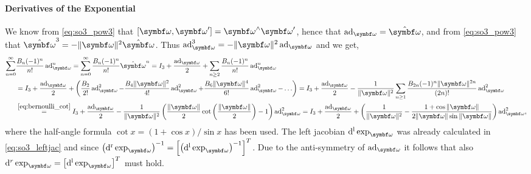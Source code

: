 \paragraph{Derivatives of the Exponential}

We know from \eqref{eq:so3_pow3} that $[\bomega, \bomega'] = \bomega^\wedge \bomega'$, hence that $\ad_\bomega = \hat \bomega$, and from \eqref{eq:so3_pow3} that $\hat \bomega^3 = - \| \bomega \|^2 \hat \bomega$. Thus $\ad_\bomega^3 = -\| \bomega \|^2 \ad_\bomega$ and we get,
\begin{equation*}
  \begin{aligned}
    \sum_{n=0}^\infty
     &
    \frac{B_n (-1)^n}{n!} \ad_\bomega^n
    = \sum_{n=0}^\infty \frac{B_n (-1)^n}{n!} \hat \bomega^n = I_3 + \frac{\ad_\bomega}{2} + \sum_{n \geq 2} \frac{B_n (-1)^n}{n!}\ad_\bomega^n                                                                                                                                                                                                                    \\
     & = I_3 + \frac{\ad_\bomega}{2} + \left( \frac{B_2}{2!}\ad_\bomega^2 - \frac{B_4 \| \bomega \|^2} {4!} \ad_\bomega^2 + \frac{B_6 \| \bomega \|^4}{6!} \ad_\bomega^2 - \ldots \right) = I_3 + \frac{\ad_\bomega}{2} - \frac{1}{\| \bomega \|^2} \sum_{n \geq 1} \frac{B_{2n} (-1)^n \| \bomega \|^{2n}}{(2n)!} \ad_\bomega^2                                   \\
     & \overset{\eqref{eq:bernoulli_cot}}= I_3 + \frac{\ad_\bomega}{2} - \frac{1}{\| \bomega \|^2} \left( \frac{\| \bomega \|}{2} \cot \left( \frac{\| \bomega \|}{2} \right) - 1 \right) \ad_\bomega^2 = I_3 + \frac{\ad_\bomega}{2} + \left( \frac{1}{\| \bomega \|^2} - \frac{1 + \cos \| \bomega \| }{2 \|\bomega \| \sin \|\bomega \|} \right) \ad_\bomega^2,
  \end{aligned}
\end{equation*}
where the half-angle formula $\cot x = (1 + \cos x) / \sin x$ has been used. The left jacobian $\dl \exp_\bomega$ was already calculated in \eqref{eq:so3_leftjac} and since $\left( \dr \exp_{\bomega} \right)^{-1} = \left[ \left( \dl \exp_{\bomega} \right)^{-1} \right]^T$. Due to the anti-symmetry of $\ad_\bomega$ it follows that also $\mathrm{d}^r \exp_\bomega = \left[ \dl \exp_\bomega \right]^T$ must hold.

